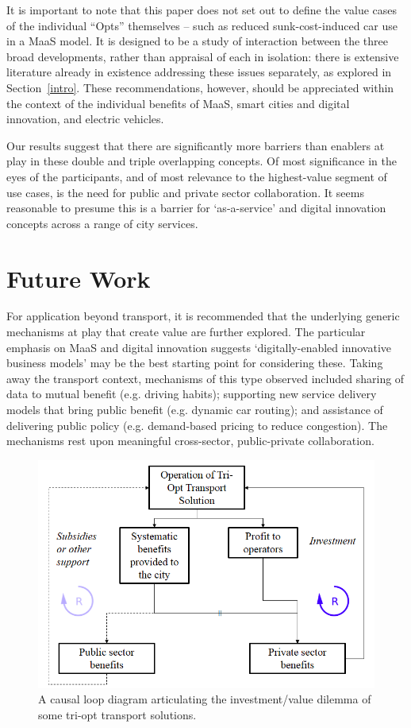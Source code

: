\documentclass[b5paper,10pt]{article}
\begin{document}
It is important to note that this paper does not set out to define the
value cases of the individual ``Opts'' themselves -- such as reduced
sunk-cost-induced car use in a MaaS model. It is designed to be a
study of interaction between the three broad developments, rather than
appraisal of each in isolation: there is extensive literature already
in existence addressing these issues separately, as explored in
Section~\ref{intro}. These recommendations, however, should be
appreciated within the context of the individual benefits of MaaS,
smart cities and digital innovation, and electric vehicles.

Our results suggest that there are significantly more barriers than
enablers at play in these double and triple overlapping concepts. Of
most significance in the eyes of the participants, and of most
relevance to the highest-value segment of use cases, is the need for
public and private sector collaboration. It seems reasonable to
presume this is a barrier for `as-a-service' and digital innovation
concepts across a range of city services.

\section{Future Work}\label{future}

For application beyond transport, it is recommended that the
underlying generic mechanisms at play that create value are further
explored. The particular emphasis on MaaS and digital innovation
suggests `digitally-enabled innovative business models' may be the
best starting point for considering these. Taking away the transport
context, mechanisms of this type observed included sharing of data to
mutual benefit (e.g. driving habits); supporting new service delivery
models that bring public benefit (e.g. dynamic car routing); and
assistance of delivering public policy (e.g. demand-based pricing to
reduce congestion). The mechanisms rest upon meaningful cross-sector,
public-private collaboration.

\begin{figure}[!h]
\centering
\includegraphics[width=0.7\columnwidth]{images/causalloop.png}
\caption{A causal loop diagram articulating the investment/value
  dilemma of some tri-opt transport solutions.}
\label{fig:causalloop}
\end{figure}
\end{document}
